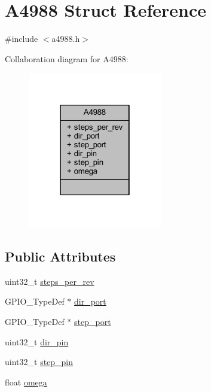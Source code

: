 \hypertarget{struct_a4988}{}\section{A4988 Struct Reference}
\label{struct_a4988}


{\ttfamily \#include $<$a4988.\+h$>$}



Collaboration diagram for A4988\+:
\nopagebreak
\begin{figure}[H]
\begin{center}
\leavevmode
\includegraphics[width=166pt]{struct_a4988__coll__graph}
\end{center}
\end{figure}
\subsection*{Public Attributes}
\begin{DoxyCompactItemize}
\item 
uint32\+\_\+t \mbox{\hyperlink{struct_a4988_a0453d56f7e20c45a4140e4af29f1c628}{steps\+\_\+per\+\_\+rev}}
\item 
G\+P\+I\+O\+\_\+\+Type\+Def $\ast$ \mbox{\hyperlink{struct_a4988_af006546fbff4560a0f37f5b4c01dee69}{dir\+\_\+port}}
\item 
G\+P\+I\+O\+\_\+\+Type\+Def $\ast$ \mbox{\hyperlink{struct_a4988_ab5092f4f2504a071d77995f9713ab36d}{step\+\_\+port}}
\item 
uint32\+\_\+t \mbox{\hyperlink{struct_a4988_a2871ee75d253c10e1e35bd600b9039db}{dir\+\_\+pin}}
\item 
uint32\+\_\+t \mbox{\hyperlink{struct_a4988_ada56cbe62748a6dc76d5386f1dde90e8}{step\+\_\+pin}}
\item 
float \mbox{\hyperlink{struct_a4988_a8ea23ea2cf8e5f0b76f0b9f9e2ed1341}{omega}}
\end{DoxyCompactItemize}


